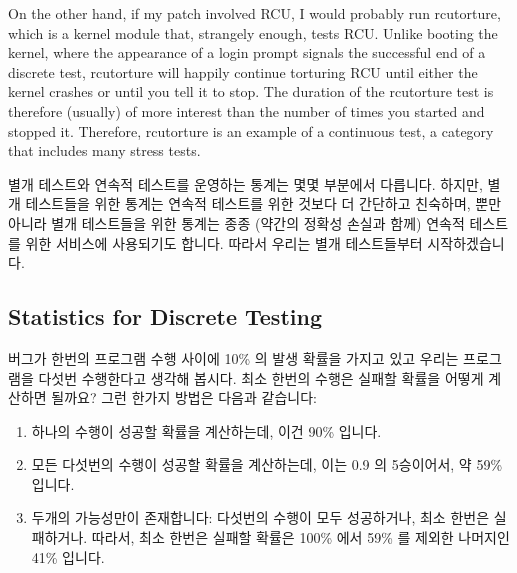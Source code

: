 On the other hand, if my patch involved RCU, I would probably run
rcutorture, which is a kernel module that, strangely enough, tests RCU.
Unlike booting the kernel, where the appearance of a login prompt
signals the successful end of a discrete test, rcutorture will happily
continue torturing RCU until either the kernel crashes or until you
tell it to stop.
The duration of the rcutorture test is therefore (usually) of more
interest than the number of times you started and stopped it.
Therefore, rcutorture is an example of a continuous test, a category
that includes many stress tests.
\fi

별개 테스트와 연속적 테스트를 운영하는 통계는 몇몇 부분에서 다릅니다.
하지만, 별개 테스트들을 위한 통계는 연속적 테스트를 위한 것보다 더 간단하고
친숙하며, 뿐만아니라 별개 테스트들을 위한 통계는 종종 (약간의 정확성 손실과
함께) 연속적 테스트를 위한 서비스에 사용되기도 합니다.
따라서 우리는 별개 테스트들부터 시작하겠습니다.

\subsection{Statistics for Discrete Testing}
\label{sec:debugging:Statistics for Discrete Testing}

버그가 한번의 프로그램 수행 사이에 10\% 의 발생 확률을 가지고 있고 우리는
프로그램을 다섯번 수행한다고 생각해 봅시다.
최소 한번의 수행은 실패할 확률을 어떻게 계산하면 될까요?
그런 한가지 방법은 다음과 같습니다:

\begin{enumerate}
\item	하나의 수행이 성공할 확률을 계산하는데, 이건 90\% 입니다.
\item	모든 다섯번의 수행이 성공할 확률을 계산하는데, 이는 0.9 의 5승이어서,
	약 59\% 입니다.
\item	두개의 가능성만이 존재합니다: 다섯번의 수행이 모두 성공하거나, 최소
	한번은 실패하거나.
	따라서, 최소 한번은 실패할 확률은 100\% 에서 59\% 를 제외한 나머지인
	41\% 입니다.

\end{enumerate}

